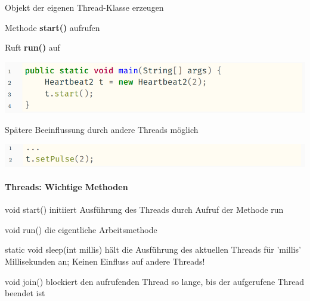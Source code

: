 \documentclass[10pt]{article}
\begin{document}
\begin{itemize*}
  \item Objekt der eigenen Thread-Klasse erzeugen
  \item Methode \textbf{start()} aufrufen
  \begin{itemize*}
    \item Ruft \textbf{run()} auf
  \end{itemize*}
  \begin{center}
    \centering
    \includegraphics[width=0.4\linewidth]{Assets/Programmierparadigmen-code-snippet-50}
  \end{center}
  \item Spätere Beeinflussung durch andere Threads möglich
  \begin{center}
    \centering
    \includegraphics[width=0.4\linewidth]{Assets/Programmierparadigmen-code-snippet-51}
  \end{center}
\end{itemize*}


\paragraph{Threads: Wichtige Methoden}

\begin{description*}
  \item[void start()] initiiert Ausführung des Threads durch Aufruf der Methode run
  \item[void run()] die eigentliche Arbeitsmethode
  \item[static void sleep(int millis)] hält die Ausführung des aktuellen Threads für 'millis' Millisekunden an; Keinen Einfluss auf andere Threads!
  \item[void join()] blockiert den aufrufenden Thread so lange, bis der aufgerufene Thread beendet ist
\end{description*}
\end{document}
